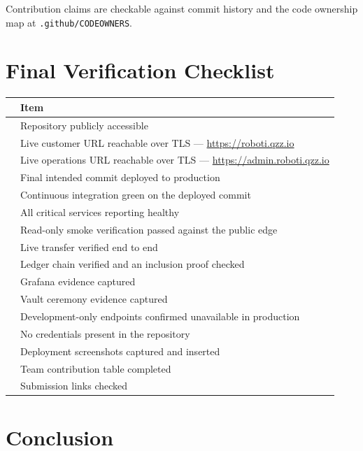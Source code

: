 \documentclass[11pt,a4paper]{article}
\newcommand{\pth}[1]{\texttt{\small #1}}
\newcommand{\chk}{\raisebox{0.4pt}{\framebox[2.6mm]{\rule{0pt}{1.6mm}}}}
\begin{document}
\noindent Contribution claims are checkable against commit history and the code ownership map at
\pth{.github/CODEOWNERS}.

\section{Final Verification Checklist}

\begin{center}
\begin{tabularx}{\textwidth}{@{}p{7mm}X@{}}
\toprule
& \textbf{Item}\\
\midrule
\chk & Repository publicly accessible\\
\chk & Live customer URL reachable over TLS --- \url{https://roboti.qzz.io}\\
\chk & Live operations URL reachable over TLS --- \url{https://admin.roboti.qzz.io}\\
\chk & Final intended commit deployed to production\\
\chk & Continuous integration green on the deployed commit\\
\chk & All critical services reporting healthy\\
\chk & Read-only smoke verification passed against the public edge\\
\chk & Live transfer verified end to end\\
\chk & Ledger chain verified and an inclusion proof checked\\
\chk & Grafana evidence captured\\
\chk & Vault ceremony evidence captured\\
\chk & Development-only endpoints confirmed unavailable in production\\
\chk & No credentials present in the repository\\
\chk & Deployment screenshots captured and inserted\\
\chk & Team contribution table completed\\
\chk & Submission links checked\\
\bottomrule
\end{tabularx}
\end{center}

\section{Conclusion}
\end{document}
